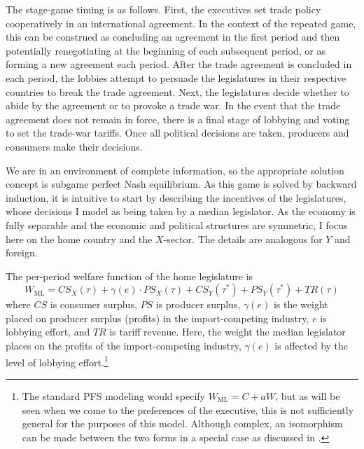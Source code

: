 \documentclass[authoryear, review]{elsarticle}
\newcommand{\ga}{\gamma}
\begin{document}
The stage-game timing is as follows. First, the executives set trade policy cooperatively in an international agreement. In the context of the repeated game, this can be construed as concluding an agreement in the first period and then potentially renegotiating at the beginning of each subsequent period, or as forming a new agreement each period. After the trade agreement is concluded in each period, the lobbies attempt to persuade the legislatures in their respective countries to break the trade agreement. Next, the legislatures decide whether to abide by the agreement or to provoke a trade war. In the event that the trade agreement does not remain in force, there is a final stage of lobbying and voting to set the trade-war tariffs. Once all political decisions are taken, producers and consumers make their decisions.

We are in an environment of complete information, so the appropriate solution concept is subgame perfect Nash equilibrium. As this game is solved by backward induction, it is intuitive to start by describing the incentives of the legislatures, whose decisions I model as being taken by a median legislator. As the economy is fully separable and the economic and political structures are symmetric, I focus here on the home country and the $X$-sector. The details are analogous for $Y$ and foreign.

The per-period welfare function of the home legislature is
\begin{equation}
  W_\text{ML} = \mathit{CS}_X(\tau) + \ga(e) \cdot \mathit{PS}_X(\tau) + \mathit{CS}_Y(\tau^*) + \mathit{PS}_Y(\tau^*) + \mathit{TR}(\tau)
  \label{eq:ml3}
\end{equation}
where $\mathit{CS}$ is consumer surplus, $\mathit{PS}$ is producer surplus, $\ga(e)$ is the weight placed on producer surplus (profits) in the import-competing industry, $e$ is lobbying effort, and $\mathit{TR}$ is tariff revenue. Here, the weight the median legislator places on the profits of the import-competing industry, $\ga(e)$ is affected by the level of lobbying effort.\footnote{The standard PFS modeling would specify $W_\text{ML} = C + aW$, but as will be seen when we come to the preferences of the executive, this is not sufficiently general for the purposes of this model. Although complex, an isomorphism can be made between the two forms in a special case as discussed in \citet{buzard2013b}.}
\end{document}
